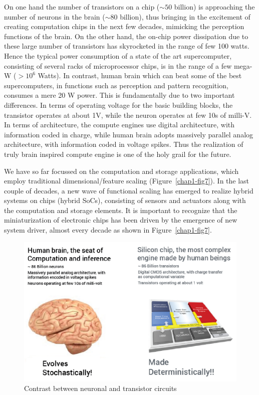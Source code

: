 \begin{multicols}{2}
On one hand the number of transistors on a chip ($\sim 50$ billion) is approaching the number of neurons in the brain ($\sim 80$ billion), thus bringing in the excitement of creating computation chips in the next few decades, mimicking the perception functions of the brain. On the other hand, the on-chip power dissipation due to these large number of transistors has skyrocketed in the range of few 100 watts. Hence the typical power consumption of a state of the art supercomputer, consisting of several racks of microprocessor chips, is in the range of a few mega-W ($> 10^6$ Watts). In contrast, human brain which can beat some of the best supercomputers, in functions such as perception and pattern recognition, consumes a mere 20 W power. This is fundamentally due to two important differences. In terms of operating voltage for the basic building blocks, the transistor operates at about 1V, while the neuron operates at few 10s of milli-V. In terms of architecture, the compute engines use digital architecture, with information coded in charge, while human brain adopts massively parallel analog architecture, with information coded in voltage spikes. Thus the realization of truly brain inspired compute engine is one of the holy grail for the future. 

We have so far focussed on the computation and storage applications, which employ traditional dimensional/feature scaling (Figure~\ref{chap1-fig7}). In the last couple of decades, a new wave of functional scaling has emerged to realize hybrid systems on chips (hybrid SoCs), consisting of sensors and actuators along with the computation and storage elements. It is important to recognize that the miniaturization of electronic chips has been driven by the emergence of new system driver, almost every decade as shown in Figure~\ref{chap1-fig7}.
\end{multicols}

\begin{figure}[H]
\centering
\includegraphics[scale=1]{src/Figures/chap1/chap1-fig06.jpg}
\caption{Contrast between neuronal and transistor circuits }\label{chap1-fig6}
\end{figure}

